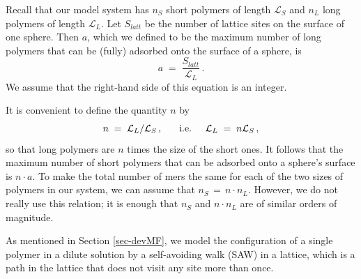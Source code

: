 \documentclass[twoside,twocolumn,9pt]{article}
\newcommand{\leng}{\mathcal{L}}
\begin{document}
Recall that our model system has $n_S$ short 
polymers of length $\leng_S$ and $n_L$ long polymers
of length $\leng_L$.  
Let $S_{latt}$ be the number of lattice sites on 
the surface of one sphere.  Then $a$, which we
defined to be the maximum
number of long polymers that can be (fully)
adsorbed onto the surface of a sphere, is 
\begin{equation}
  \label{eq.aequal}
     a  \;=\;  \frac{S_{latt}}{\leng_L} \,.
\end{equation}
We assume that the right-hand side of this equation is an integer.  

It is convenient to define the quantity $n$ by \begin{equation}
   \label{eq.ndefn}
    n\;=\;\leng_L/\leng_S  \,,  \hspace{6mm}\hbox{i.e.}
     \hspace{5mm}  \leng_L  \;=\;  n\leng_S \,,
\end{equation}
so that
long polymers are $n$ times the size of the short ones.
It follows that the maximum number of short polymers
that can be adsorbed onto a sphere's surface is $n\cdot a$.
To make the total %
number of mers the same for each
of the two sizes of polymers in our system,
we can assume that $n_S \,=\, n\cdot n_L$.  However, we do not really use this relation; it is enough that $n_S$ and $n\cdot n_L$
are of similar orders of magnitude.



As mentioned in Section \ref{sec-devMF},    %
we model the configuration of a single  polymer in a dilute solution by a self-avoiding walk (SAW) in a lattice, which is a path in the lattice that does not visit any site more than once.
\end{document}

